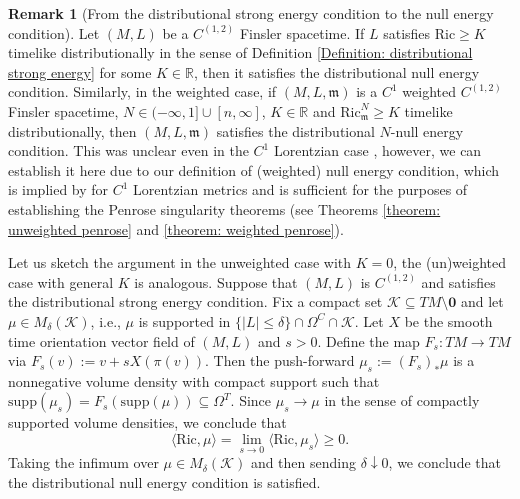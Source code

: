 \documentclass[a4paper,11pt]{article}
\numberwithin{equation}{section}
\theoremstyle{definition}
\newtheorem{Remark}[Definition]{Remark}
\theoremstyle{plain}
\newcommand{\R}{\mathbb R}
\newcommand{\Ric}{\mathrm{Ric}}
\newcommand{\m}{\mathfrak m}
\begin{document}
\begin{Remark}[From the distributional strong energy condition to the null energy condition]
Let $(M,L)$ be a $C^{(1,2)}$ Finsler spacetime. If $L$ satisfies $\Ric \geq K$ timelike distributionally in the sense of Definition \ref{Definition: distributional strong energy} for some $K \in \R$, then it satisfies the distributional null energy condition. 
Similarly, in the weighted case, if $(M,L,\m)$ is a $C^1$ weighted $C^{(1,2)}$ Finsler spacetime, $N \in (-\infty,1] \cup [n,\infty]$, $K \in \R$ and $\Ric^N_\m \geq K$ timelike distributionally, then $(M,L, \m)$ satisfies the distributional $N$-null energy condition. 
This was unclear even in the $C^1$ Lorentzian case \cite{Graf-SingularityC1}, however, we can establish it here due to our definition of (weighted) null energy condition, which is implied by \cite[Def.\ 5.1]{Graf-SingularityC1} for $C^1$ Lorentzian metrics and is sufficient for the purposes of establishing the Penrose singularity theorems (see Theorems \ref{theorem: unweighted penrose} and \ref{theorem: weighted penrose}).

Let us sketch the argument in the unweighted case with $K = 0$, the (un)weighted case with general $K$ is analogous. 
Suppose that $(M,L)$ is $C^{(1,2)}$ and satisfies the distributional strong energy condition. 
Fix a compact set $\mathcal K \subseteq TM \setminus \mathbf 0$ and let $\mu \in M_\delta(\mathcal K)$, i.e., $\mu$ is supported in $\{|L| \leq \delta\} \cap \Omega^C \cap \mathcal K$. 
Let $X$ be the smooth time orientation vector field of $(M,L)$ and $s > 0$. Define the map $F_s:TM \to TM$ via $F_s(v):= v + sX(\pi(v))$.
Then the push-forward $\mu_s :=(F_s)_* \mu$ is a nonnegative volume density with compact support such that $\mathrm{supp}(\mu_s) = F_s(\mathrm{supp}(\mu)) \subseteq \Omega^T$. 
Since $\mu_s \to \mu$ in the sense of compactly supported volume densities, we conclude that
\begin{equation*}
    \langle \Ric,\mu\rangle = \lim_{s \to 0} \langle \Ric,\mu_s\rangle \geq 0.
\end{equation*}
Taking the infimum over $\mu \in M_\delta(\mathcal K)$ and then sending $\delta \downarrow 0$, we conclude that the distributional null energy condition is satisfied.
\end{Remark}
\end{document}
